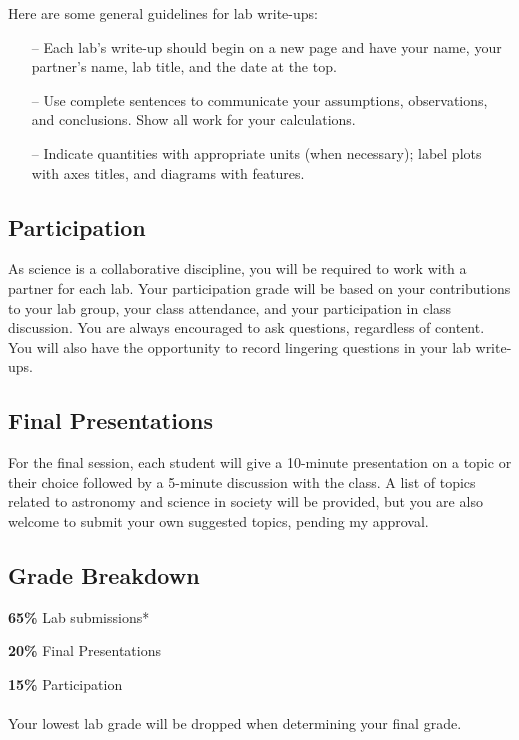 \documentclass[11pt]{article}
\begin{document}
\noindent Here are some general guidelines for lab write-ups:
\begin{itemize}
\item[--] Each lab's write-up should begin on a new page and have your name, your partner's name, lab title, and the date at the top.
\item[--] Use complete sentences to communicate your assumptions, observations, and conclusions. Show all work for your calculations.

\item[--] Indicate quantities with appropriate units (when necessary); label plots with axes titles, and diagrams with features.

\end{itemize}

\subsection*{Participation}
\noindent As science is a collaborative discipline, you will be required to work with a partner for each lab. Your participation grade will be based on your contributions to your lab group, your class attendance, and your participation in class discussion. You are always encouraged to ask questions, regardless of content. You will also have the opportunity to record lingering questions in your lab write-ups.

\smallskip

\subsection*{Final Presentations}
\noindent For the final session, each student will give a 10-minute presentation on a topic or their choice followed by a 5-minute discussion with the class. A list of topics related to astronomy and science in society will be provided, but you are also welcome to submit your own suggested topics, pending my approval.

\subsection*{Grade Breakdown}

\noindent \textbf{65\%} Lab submissions*

\noindent \textbf{20\%} Final Presentations

\noindent \textbf{15\%} Participation \\
\\
\noindent *Your lowest lab grade will be dropped when determining your final grade.
\end{document}
